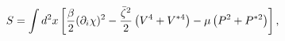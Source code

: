 \begin{equation} S=  \int d^2x\left[\frac\beta2(\partial_i\chi)^2-
{\bar\zeta^2\over 2}\left(V^4+V^{*4}\right)- \mu\left(P^2+P^{*2}\right)
\right],\label{comact}\end{equation} 
